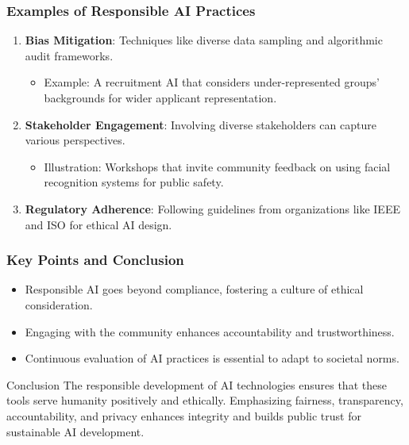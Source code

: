 \documentclass[aspectratio=169]{beamer}
\begin{document}
\begin{frame}[fragile]
    \frametitle{Examples of Responsible AI Practices}
    
    \begin{enumerate}
        \item \textbf{Bias Mitigation}: Techniques like diverse data sampling and algorithmic audit frameworks.
            \begin{itemize}
                \item Example: A recruitment AI that considers under-represented groups' backgrounds for wider applicant representation.
            \end{itemize}
        
        \item \textbf{Stakeholder Engagement}: Involving diverse stakeholders can capture various perspectives.
            \begin{itemize}
                \item Illustration: Workshops that invite community feedback on using facial recognition systems for public safety.
            \end{itemize}
        
        \item \textbf{Regulatory Adherence}: Following guidelines from organizations like IEEE and ISO for ethical AI design.
    \end{enumerate}
\end{frame}

\begin{frame}[fragile]
    \frametitle{Key Points and Conclusion}
    
    \begin{itemize}
        \item Responsible AI goes beyond compliance, fostering a culture of ethical consideration.
        \item Engaging with the community enhances accountability and trustworthiness.
        \item Continuous evaluation of AI practices is essential to adapt to societal norms.
    \end{itemize}
    
    \begin{block}{Conclusion}
        The responsible development of AI technologies ensures that these tools serve humanity positively and ethically. Emphasizing fairness, transparency, accountability, and privacy enhances integrity and builds public trust for sustainable AI development.
    \end{block}
\end{frame}
\end{document}
